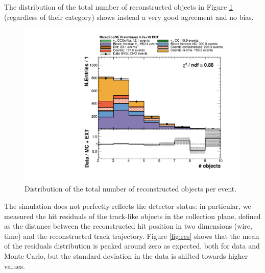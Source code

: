 The distribution of the total number of reconstructed objects in Figure \ref{fig:nobjects} (regardless of their category) shows instead a very good agreement and no bias.

\begin{figure}[htbp]
\centering
  \includegraphics[width=0.65\linewidth]{figures/h_n_objects.pdf}
  \caption{Distribution of the total number of reconstructed objects per event.}
  \label{fig:nobjects}
\end{figure}

The simulation does not perfectly reflects the detector status: in particular, we measured the hit residuals of the track-like objects in the collection plane, defined as the distance between the reconstructed hit position in two dimensions (wire, time) and the reconstructed track trajectory. Figure \ref{fig:res} shows that the mean of the residuals distribution is peaked around zero as expected, both for data and Monte Carlo, but the standard deviation in the data is shifted towards higher values. 


